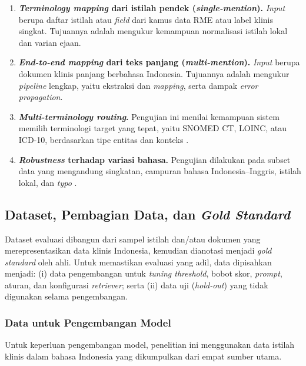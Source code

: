\begin{enumerate}
    \item \textbf{\textit{Terminology mapping} dari istilah pendek (\textit{single-mention}).} \textit{Input} berupa daftar istilah atau \textit{field} dari kamus data RME atau label klinis singkat. Tujuannya adalah mengukur kemampuan normalisasi istilah lokal dan varian ejaan.
    \item \textbf{\textit{End-to-end mapping} dari teks panjang (\textit{multi-mention}).} \textit{Input} berupa dokumen klinis panjang berbahasa Indonesia. Tujuannya adalah mengukur \textit{pipeline} lengkap, yaitu ekstraksi dan \textit{mapping}, serta dampak \textit{error propagation}.
    \item \textbf{\textit{Multi-terminology routing}.} Pengujian ini menilai kemampuan sistem memilih terminologi target yang tepat, yaitu SNOMED CT, LOINC, atau ICD-10, berdasarkan tipe entitas dan konteks \citep{ayuningtyas_bringing_2025}.
    \item \textbf{\textit{Robustness} terhadap variasi bahasa.} Pengujian dilakukan pada subset data yang mengandung singkatan, campuran bahasa Indonesia--Inggris, istilah lokal, dan \textit{typo} \citep{purwitasari_comparison_2023}.
\end{enumerate}

\subsection{Dataset, Pembagian Data, dan \textit{Gold Standard}}

Dataset evaluasi dibangun dari sampel istilah dan/atau dokumen yang merepresentasikan data klinis Indonesia, kemudian dianotasi menjadi \textit{gold standard} oleh ahli. Untuk memastikan evaluasi yang adil, data dipisahkan menjadi: (i) data pengembangan untuk \textit{tuning threshold}, bobot skor, \textit{prompt}, aturan, dan konfigurasi \textit{retriever}; serta (ii) data uji (\textit{hold-out}) yang tidak digunakan selama pengembangan.

\subsubsection{Data untuk Pengembangan Model}

Untuk keperluan pengembangan model, penelitian ini menggunakan data istilah klinis dalam bahasa Indonesia yang dikumpulkan dari empat sumber utama.

